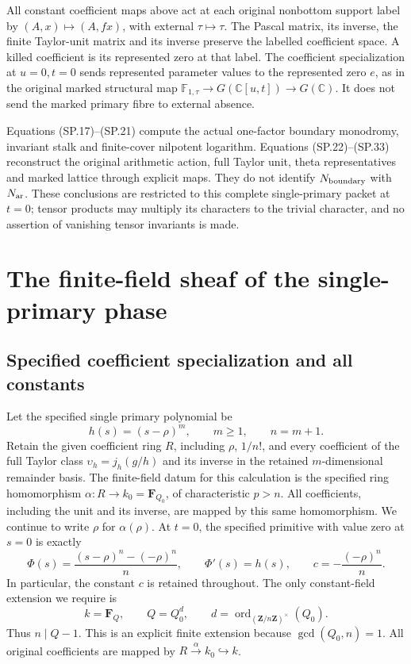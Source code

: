 All constant coefficient maps above act at each original
nonbottom support label by
\((A,x)\mapsto(A,fx)\), with external \(\tau\mapsto\tau\).
The Pascal matrix, its inverse, the finite Taylor-unit
matrix and its inverse preserve the labelled coefficient
space. A killed coefficient is its represented zero at
that label. The coefficient specialization at \(u=0,t=0\)
sends represented parameter values to the represented
zero \(e\), as in the original marked structural map
\(\mathbb F_{1,\tau}\to G(\mathbb C[u,t])\to G(\mathbb C)\).
It does not send the marked primary fibre to external
absence.

Equations (SP.17)--(SP.21) compute the actual one-factor
boundary monodromy, invariant stalk and finite-cover
nilpotent logarithm. Equations (SP.22)--(SP.33) reconstruct
the original arithmetic action, full Taylor unit, theta
representatives and marked lattice through explicit maps.
They do not identify \(N_{\rm boundary}\) with \(N_{\rm ar}\).
These conclusions are restricted to this complete
single-primary packet at \(t=0\); tensor products may
multiply its characters to the trivial character, and
no assertion of vanishing tensor invariants is made.

\section{The finite-field sheaf of the single-primary phase}
\label{CFStage:sec:SPF}

\subsection{Specified coefficient specialization and all constants}

Let the specified single primary polynomial be
\[
 h(s)=(s-\rho)^m,\qquad m\geq1,\qquad n=m+1.
 \tag{SPF.1}\label{CFStage:eq:SPF1}
\]
Retain the given coefficient ring \(R\), including \(\rho\), \(1/n!\),
and every coefficient of the full Taylor class
\(\upsilon_h=j_h(g/h)\) and its inverse in the retained
\(m\)-dimensional remainder basis.
The finite-field datum for this calculation is the specified ring
homomorphism
\(\alpha:R\longrightarrow k_0=\mathbf F_{Q_0}\), of characteristic
\(p>n\). All coefficients, including the unit and its inverse, are
mapped by this same homomorphism. We continue to write \(\rho\) for
\(\alpha(\rho)\). At \(t=0\), the specified primitive with value zero
at \(s=0\) is exactly
\[
 \Phi(s)=\frac{(s-\rho)^n-(-\rho)^n}{n},\qquad
 \Phi'(s)=h(s),\qquad
 c=-\frac{(-\rho)^n}{n}.
 \tag{SPF.2}\label{CFStage:eq:SPF2}
\]
In particular, the constant \(c\) is retained throughout. The only
constant-field extension we require is
\[
 k=\mathbf F_Q,\qquad Q=Q_0^d,\qquad
 d=\operatorname{ord}_{(\mathbf Z/n\mathbf Z)^\times}(Q_0).
 \tag{SPF.3}\label{CFStage:eq:SPF3}
\]
Thus \(n\mid Q-1\). This is an explicit finite extension because
\(\gcd(Q_0,n)=1\). All original coefficients are mapped by
\(R\xrightarrow{\alpha}k_0\hookrightarrow k\).

